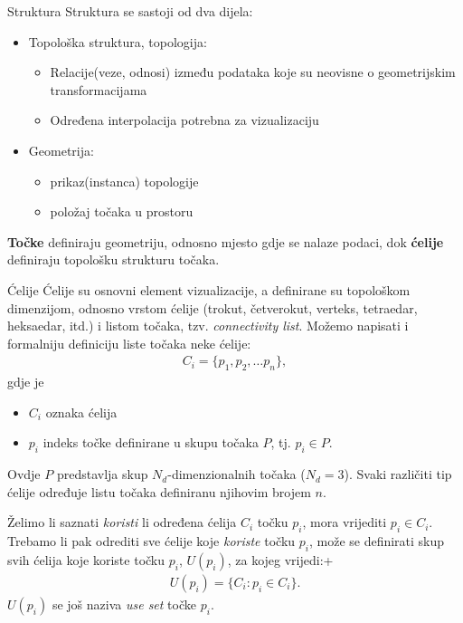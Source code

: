 \documentclass[9pt]{beamer}
\begin{document}
\begin{frame}{Struktura}
Struktura se sastoji od dva dijela:
\begin{itemize}
	\item Topološka struktura, topologija:
	\begin{itemize}
		\item  Relacije(veze, odnosi) između podataka koje su neovisne o geometrijskim transformacijama 
		\item  Određena interpolacija potrebna za vizualizaciju 
	\end{itemize}
	\item Geometrija:
	\begin{itemize}
		\item prikaz(instanca) topologije
		\item položaj točaka u prostoru
	\end{itemize}
\end{itemize}
\textbf{Točke} definiraju geometriju, odnosno mjesto gdje se nalaze podaci, dok \textbf{ćelije} definiraju topološku strukturu točaka.
\end{frame}

\begin{frame}{Ćelije}
	Ćelije su osnovni element vizualizacije, a definirane su topološkom dimenzijom, odnosno vrstom ćelije (trokut, četverokut, verteks, tetraedar, heksaedar, itd.) i listom točaka, tzv. \textit{connectivity list}.
	Možemo napisati i formalniju definiciju liste točaka neke ćelije: 
	\begin{align*}
	C_{i} = \{ p_{1}, p_{2}, \ldots p_{n} \},
	\end{align*}
	gdje je 
	\begin{itemize}
		\item $ C_{i} $ oznaka ćelija
		\item $p_{i}$ indeks točke definirane u skupu točaka $P$, tj. $p_{i}\in P$.
	\end{itemize}
	Ovdje $P$ predstavlja skup $N_d$-dimenzionalnih točaka ($N_d=3$). Svaki različiti tip ćelije određuje listu točaka definiranu njihovim brojem $n$.
	
	Želimo li saznati \textit{koristi} li određena ćelija $C_{i}$ točku $p_{i}$, mora vrijediti 
	$p_{i} \in C_{i}$. Trebamo li pak odrediti sve ćelije koje \textit{koriste} točku $p_{i}$, može se definirati skup svih ćelija koje koriste točku $p_{i}$, $U(p_{i})$, za kojeg vrijedi:+
	\begin{align*}
	U(p_{i}) = \{ C_{i}:p_{i} \in C_{i}\}.
	\end{align*}	
	$U(p_{i})$ se još naziva \textit{use set} točke $p_i$.
\end{frame}
\end{document}
